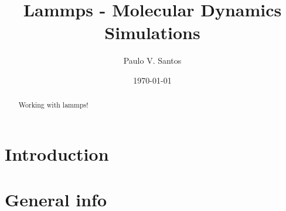 \documentclass[%
preprint,
superscriptaddress,
 amsmath,amssymb,
prapplied,
floatfix,
tightenlines,
]{revtex4-2}
\begin{document}

\title[LAMMPS]{Lammps - Molecular Dynamics Simulations }


\author{Paulo V. Santos}
 

\date{\today}%

\begin{abstract}
Working with lammps!
\end{abstract}

\maketitle
\section{Introduction}
\label{sec:intro}

\section{General info}
\end{document}
